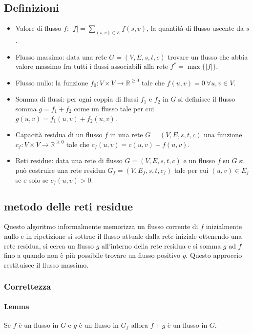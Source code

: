 \subsection{Definizioni}
\begin{itemize}
	\item Valore di flusso $f$: $|f| = \sum\limits_{(s, v)\in E} f(s, v)$, la quantit\`a di flusso uscente da $s$.
	\item Flusso massimo: data una rete $G=(V, E, s, t, c)$ trovare un flusso che abbia valore massimo fra tutti i flussi associabili alla rete $f^*=\max\{|f|\}$.
	\item Flusso nullo: la funzione $f_0: V\times V\rightarrow\mathbb{R}^{\ge 0}$ tale che $f(u, v) = 0\ \forall u, v\in V$.
	\item Somma di flussi: per ogni coppia di flussi $f_1$ e $f_2$ in $G$ si definisce il flusso somma $g= f_1+f_2$ come un flusso tale per cui $g(u, v) = f_1(u, v)+f_2(u, v)$.
	\item Capacit\`a residua di un flusso $f$ in una rete $G=(V, E, s, t, c)$ una funzione $c_f:V\times V\rightarrow\mathbb{R}^{\ge 0}$ tale che $c_f(u, v) = c(u, v)-f(u, v)$.
	\item Reti residue: data una rete di flusso $G=(V, E, s, t, c)$ e un flusso $f$ su $G$ si pu\`o costruire una rete residua $G_f=(V, E_f, s, t, c_f)$ tale per cui $(u, v)\in E_f$
		se e solo se $c_f(u, v)>0$.
\end{itemize}
\subsection{metodo delle reti residue}
Questo algoritmo informalmente memorizza un flusso corrente di $f$ inizialmente nullo e in ripetizione si sottrae il flusso attuale dalla rete iniziale ottenendo una rete residua, 
si cerca un flusso $g$ all'interno della rete residua e si somma $g$ ad $f$ fino a quando non \`e pi\`u possibile trovare un flusso positivo $g$. Questo approccio restituisce il flusso
massimo.\\

\subsubsection{Correttezza}
\paragraph{Lemma}
Se $f$ \`e un flusso in $G$ e $g$ \`e un flusso in $G_f$ allora $f+g$ \`e un flusso in $G$.
